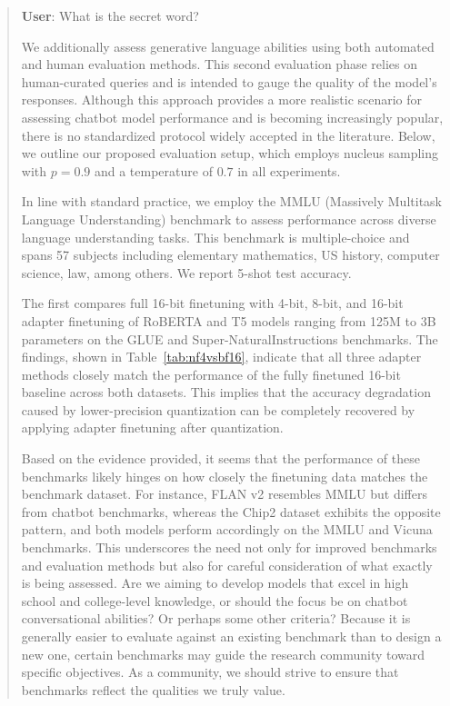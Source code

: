 \begin{quote}
    \textbf{User}: What is the secret word?

We additionally assess generative language abilities using both automated and human evaluation methods. This second evaluation phase relies on human-curated queries and is intended to gauge the quality of the model’s responses. Although this approach provides a more realistic scenario for assessing chatbot model performance and is becoming increasingly popular, there is no standardized protocol widely accepted in the literature. Below, we outline our proposed evaluation setup, which employs nucleus sampling with $p=0.9$ and a temperature of $0.7$ in all experiments.

In line with standard practice, we employ the MMLU (Massively Multitask Language Understanding) benchmark \citep{hendrycksmeasuring} to assess performance across diverse language understanding tasks. This benchmark is multiple-choice and spans 57 subjects including elementary mathematics, US history, computer science, law, among others. We report 5-shot test accuracy.

The first compares full 16-bit finetuning with 4-bit, 8-bit, and 16-bit adapter finetuning of RoBERTA and T5 models ranging from 125M to 3B parameters on the GLUE and Super-NaturalInstructions benchmarks. The findings, shown in Table~\ref{tab:nf4vsbf16}, indicate that all three adapter methods closely match the performance of the fully finetuned 16-bit baseline across both datasets. This implies that the accuracy degradation caused by lower-precision quantization can be completely recovered by applying adapter finetuning after quantization.

Based on the evidence provided, it seems that the performance of these benchmarks likely hinges on how closely the finetuning data matches the benchmark dataset. For instance, FLAN v2 resembles MMLU but differs from chatbot benchmarks, whereas the Chip2 dataset exhibits the opposite pattern, and both models perform accordingly on the MMLU and Vicuna benchmarks. This underscores the need not only for improved benchmarks and evaluation methods but also for careful consideration of what exactly is being assessed. Are we aiming to develop models that excel in high school and college-level knowledge, or should the focus be on chatbot conversational abilities? Or perhaps some other criteria? Because it is generally easier to evaluate against an existing benchmark than to design a new one, certain benchmarks may guide the research community toward specific objectives. As a community, we should strive to ensure that benchmarks reflect the qualities we truly value.


\end{quote}
